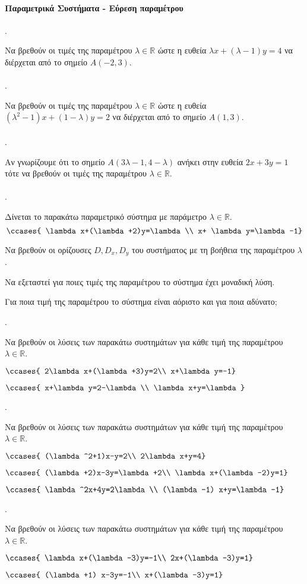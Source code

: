 \documentclass[11pt,a4paper,twocolumn]{article}
\newcounter{askhsh}
\newcommand{\askhsh}{\large\theaskhsh.\ \addtocounter{askhsh}{1}}
\begin{document}
\paragraph{Παραμετρικά Συστήματα - Εύρεση παραμέτρου}
\askhsh Να βρεθούν οι τιμές της παραμέτρου $ \lambda\in\mathbb{R} $ ώστε η ευθεία $ \lambda x+(\lambda-1)y=4 $ να διέρχεται από το σημείο $ A(-2,3) $.\\\\
\askhsh Να βρεθούν οι τιμές της παραμέτρου $ \lambda\in\mathbb{R} $ ώστε η ευθεία $ (\lambda^2-1)x+(1-\lambda)y=2 $ να διέρχεται από το σημείο $ A(1,3) $.\\\\
\askhsh Αν γνωρίζουμε ότι το σημείο $ A(3\lambda-1,4-\lambda) $ ανήκει στην ευθεία $ 2x+3y=1 $ τότε να βρεθούν οι τιμές της παραμέτρου $ \lambda\in\mathbb{R} $.\\\\
\askhsh Δίνεται το παρακάτω παραμετρικό σύστημα με παράμετρο $ \lambda\in\mathbb{R} $.
\[ \ccases{
\lambda x+(\lambda+2)y=\lambda\\
x+ \lambda y=\lambda-1} \]
\begin{alist}
\item Να βρεθούν οι ορίζουσες $ D,D_x,D_y $ του συστήματος με τη βοήθεια της παραμέτρου $ \lambda $.
\item Να εξεταστεί για ποιες τιμές της παραμέτρου το σύστημα έχει μοναδική λύση.
\item Για ποια τιμή της παραμέτρου το σύστημα είναι αόριστο και για ποια αδύνατο;
\end{alist}
\askhsh Να βρεθούν οι λύσεις των παρακάτω συστημάτων για κάθε τιμή της παραμέτρου $ \lambda\in\mathbb{R} $.
\begin{alist}
\item $\ccases{
2\lambda x+(\lambda+3)y=2\\
x+\lambda y=-1}$
\item $\ccases{
x+\lambda y=2-\lambda\\
\lambda x+y=\lambda}$
\end{alist}
\askhsh Να βρεθούν οι λύσεις των παρακάτω συστημάτων για κάθε τιμή της παραμέτρου $ \lambda\in\mathbb{R} $.
\begin{alist}
\item $\ccases{
(\lambda^2+1)x-y=2\\
2\lambda x+y=4}$
\item $\ccases{
(\lambda+2)x-3y=\lambda+2\\
\lambda x+(\lambda-2)y=1}$
\item $\ccases{
\lambda^2x+4y=2\lambda\\
(\lambda-1) x+y=\lambda-1}$
\end{alist}
\askhsh Να βρεθούν οι λύσεις των παρακάτω συστημάτων για κάθε τιμή της παραμέτρου $ \lambda\in\mathbb{R} $.
\begin{alist}
\item $\ccases{
\lambda x+(\lambda-3)y=-1\\
2x+(\lambda-3)y=1}$
\item $\ccases{
(\lambda+1) x-3y=-1\\
x+(\lambda-3)y=1}$
\end{alist}
\end{document}
